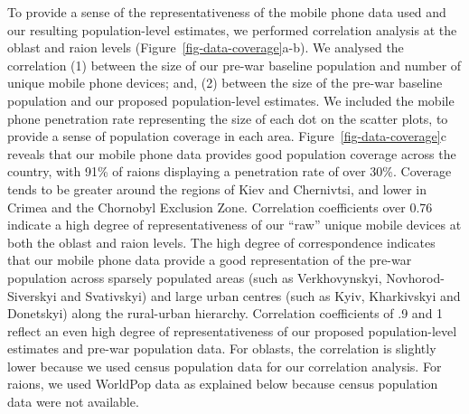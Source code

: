 \documentclass[
  sn-nature,
  11pt,
]{sn-jnl}
\begin{document}
To provide a sense of the representativeness of the mobile phone data
used and our resulting population-level estimates, we performed
correlation analysis at the oblast and raion levels
(Figure~\ref{fig-data-coverage}a-b). We analysed the correlation (1)
between the size of our pre-war baseline population and number of unique
mobile phone devices; and, (2) between the size of the pre-war baseline
population and our proposed population-level estimates. We included the
mobile phone penetration rate representing the size of each dot on the
scatter plots, to provide a sense of population coverage in each area.
Figure~\ref{fig-data-coverage}c reveals that our mobile phone data
provides good population coverage across the country, with 91\% of
raions displaying a penetration rate of over 30\%. Coverage tends to be
greater around the regions of Kiev and Chernivtsi, and lower in Crimea
and the Chornobyl Exclusion Zone. Correlation coefficients over 0.76
indicate a high degree of representativeness of our ``raw'' unique
mobile devices at both the oblast and raion levels. The high degree of
correspondence indicates that our mobile phone data provide a good
representation of the pre-war population across sparsely populated areas
(such as Verkhovynskyi, Novhorod-Siverskyi and Svativskyi) and large
urban centres (such as Kyiv, Kharkivskyi and Donetskyi) along the
rural-urban hierarchy. Correlation coefficients of .9 and 1 reflect an
even high degree of representativeness of our proposed population-level
estimates and pre-war population data. For oblasts, the correlation is
slightly lower because we used census population data for our
correlation analysis. For raions, we used WorldPop data as explained
below because census population data were not available.
\end{document}
